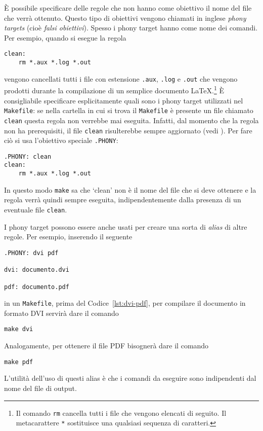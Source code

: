 È possibile specificare delle regole che non hanno come obiettivo il nome del
file che verrà ottenuto.  Questo tipo di obiettivi vengono chiamati in inglese
\emph{phony targets} (cioè \emph{falsi obiettivi}).  Spesso i phony target hanno
come nome dei comandi. Per esempio, quando si esegue la regola
\begin{lstlisting}
clean:
	rm *.aux *.log *.out
\end{lstlisting}
vengono cancellati tutti i file con estensione \verb|.aux|, \verb|.log| e
\verb|.out| che vengono prodotti durante la compilazione di un semplice
documento
\LaTeX.\footnote{Il comando \texttt{rm} cancella tutti i file che vengono
  elencati di seguito.  Il metacarattere \texttt{*} sostituisce una qualsiasi
  sequenza di caratteri.}
È consigliabile specificare esplicitamente quali sono i phony target utilizzati
nel \verb|Makefile|: se nella cartella in cui si trova il \verb|Makefile| è
presente un file chiamato \verb|clean| questa regola non verrebbe mai eseguita.
Infatti, dal momento che la regola non ha prerequisiti, il file \texttt{clean}
risulterebbe sempre aggiornato (vedi \textcite[31]{gnu:make}).  Per fare ciò si
usa l'obiettivo speciale \verb|.PHONY|:
\begin{lstlisting}
.PHONY: clean
clean:
	rm *.aux *.log *.out
\end{lstlisting}
In questo modo \verb|make| sa che `clean' non è il nome del file che si deve
ottenere e la regola verrà quindi sempre eseguita, indipendentemente dalla
presenza di un eventuale file \verb|clean|.

I phony target possono essere anche usati per creare una sorta di \emph{alias}
di altre regole.  Per esempio, inserendo il seguente
\begin{lstlisting}[caption=I prerequisiti della regola dell'obiettivo \texttt{.PHONY}
sono i nomi dei phony target che vengono successivamente specificati,label=lst:phony]
.PHONY: dvi pdf

dvi: documento.dvi

pdf: documento.pdf
\end{lstlisting}
in un \verb|Makefile|, prima del Codice~\ref{lst:dvi-pdf}, per compilare il
documento in formato \textsc{DVI} servirà dare il comando
\begin{verbatim}
make dvi
\end{verbatim}
Analogamente, per ottenere il file \textsc{PDF} bisognerà dare il comando
\begin{verbatim}
make pdf
\end{verbatim}
L'utilità dell'uso di questi alias è che i comandi da eseguire sono indipendenti
dal nome del file di output.

